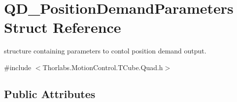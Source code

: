 \hypertarget{struct_q_d___position_demand_parameters}{}\section{Q\+D\+\_\+\+Position\+Demand\+Parameters Struct Reference}
\label{struct_q_d___position_demand_parameters}


structure containing parameters to contol position demand output.  




{\ttfamily \#include $<$Thorlabs.\+Motion\+Control.\+T\+Cube.\+Quad.\+h$>$}

\subsection*{Public Attributes}
